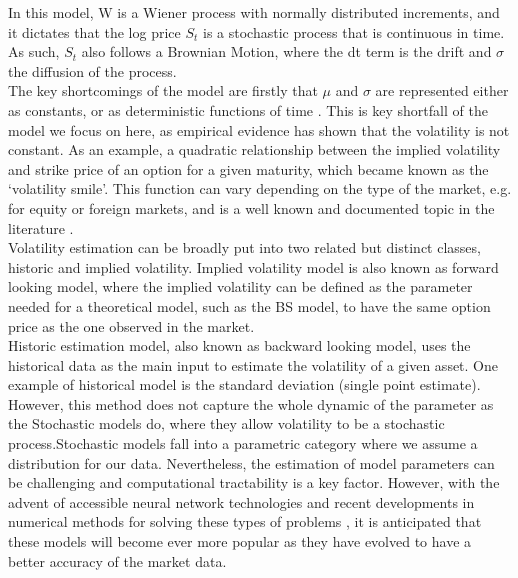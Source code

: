 \documentclass[12pt,oneside]{article}
\begin{document}
In this model, W is a Wiener process with normally distributed increments, and it dictates that the log price $S_t$ is a stochastic process that is continuous in time. As such, $S_t$ also follows a Brownian Motion, where the dt term is the drift and $\sigma$ the diffusion of the process. 
\\

The key shortcomings of the model are firstly that $\mu$ and $\sigma$ are represented either as constants, or as deterministic functions of time \cite{BlackScholes1973, Gatheral2014}. This is key shortfall of the model we focus on here, as empirical evidence has shown that the volatility is not constant. As an example, a quadratic  relationship between the implied volatility and strike price of an option for a given maturity, which became known as the `volatility smile'. This function can vary depending on the type of the market, e.g. for equity or foreign markets, and is a well known and documented topic in the literature \cite{Hull2015}.
\\

Volatility estimation can be broadly put into two related but distinct classes, historic and implied volatility. Implied volatility model is also known as forward looking model, where the implied volatility can be defined as the parameter needed for a theoretical model, such as the BS model, to have the same option price as the one observed in the market.
\\

Historic estimation model, also known as backward looking model, uses the historical data as the main input to estimate the volatility of a given asset. One example of historical model is the standard deviation (single point estimate). However, this method does not capture the whole dynamic of the parameter as the Stochastic models do, where they allow volatility to be a stochastic process.Stochastic models fall into a parametric category where we assume a distribution for our data. Nevertheless, the estimation of model parameters can be challenging and computational tractability is a key factor. However, with the advent of accessible neural network technologies and recent developments in numerical methods for solving these types of problems \cite{Horvath2019}, it is anticipated that these models will become ever more popular as they have evolved to have a better accuracy of the market data.
\\
\end{document}
